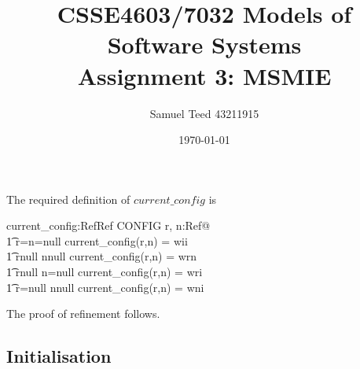 \documentclass{article}
\begin{document}
\title{\bf CSSE4603/7032 Models of Software Systems\\[1ex] 
Assignment 3: MSMIE}
\author{Samuel Teed 43211915} %
\date{\today}
\maketitle


The required definition of $current\_config$  is

\begin{axdef}
current\_config:Ref\cross Ref \fun CONFIG
\ST
\forall r, n:Ref@\\
\t1 r=n=null \implies current\_config(r,n) = wii\\
\t1 r\neq null \land n\neq null \implies current\_config(r,n) = wrn\\
\t1 r\neq null \land n=null \implies current\_config(r,n) = wri\\
\t1 r=null \land n\neq null \implies current\_config(r,n) = wni
\end{axdef}

The proof of refinement follows.

\subsection*{Initialisation}

\end{document}
